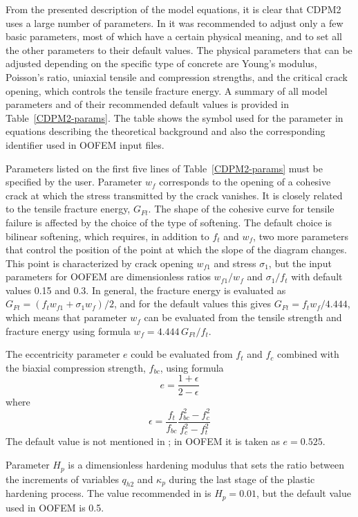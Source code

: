 \documentclass[a4paper]{article}
\begin{document}
From the presented description of the model equations,
it is clear that CDPM2 uses a large number of parameters. In \cite{GraXenNys13}
it was recommended to adjust only a few basic parameters, most of which have 
a certain physical meaning, and to set all the other parameters to their
default values. The physical parameters that can be adjusted depending on
the specific type of concrete are Young's modulus, Poisson's ratio, uniaxial
tensile and compression strengths, and the critical crack opening,
which controls the tensile fracture energy. 
A summary of all model parameters and of their recommended default values
is provided in Table~\ref{CDPM2-params}. The table shows the symbol used for the parameter
in equations describing the theoretical background and also the corresponding identifier
used in OOFEM input files. 

Parameters listed on the first five lines of Table~\ref{CDPM2-params} 
must be specified by the user. Parameter $w_f$ corresponds to the opening
of a cohesive crack at which the stress transmitted by the crack vanishes.
It is closely related to the tensile fracture energy, $G_{Ft}$.
The shape of the cohesive curve for tensile failure is affected by
the choice of the type of softening. The default choice is bilinear
softening, which requires, in addition to $f_t$ and $w_f$, two more
parameters that control the position of the point at which the slope 
of the diagram changes. This point is characterized by crack opening $w_{f1}$
and stress $\sigma_1$, but the input parameters for OOFEM are dimensionless
ratios $w_{f1}/w_f$ and $\sigma_1/f_t$ with default values 0.15 and 0.3.
In general, the fracture energy is evaluated as $G_{Ft}=(f_tw_{f1} +\sigma_1 w_f)/2$, and for the default values this gives $G_{Ft}=f_tw_f/4.444$,
which means that parameter $w_f$ can be evaluated from the tensile strength
and fracture energy using formula $w_f=4.444\,G_{Ft}/f_t$.

The eccentricity parameter $e$ could be evaluated from $f_t$ and $f_c$
combined with the biaxial compression strength, $f_{bc}$, using formula
\begin{equation}
e=    \frac{1+\epsilon}{2-\epsilon}
\end{equation}
where 
\begin{equation}
\epsilon=\frac{f_t}{f_{bc}}\frac{f_{bc}^2-f_c^2}{f_c^2-f_t^2}
\end{equation}
The default value is not mentioned in  \cite{GraXenNys13};
in OOFEM it is taken as $e=0.525$. 

Parameter $H_p$ is a dimensionless hardening modulus that sets the
ratio between the increments of variables $q_{h2}$ and $\kappa_p$
during the last stage of the plastic hardening process.
The value recommended in  \cite{GraXenNys13} is $H_p=0.01$,
but the default value used in OOFEM is 0.5.
\end{document}

